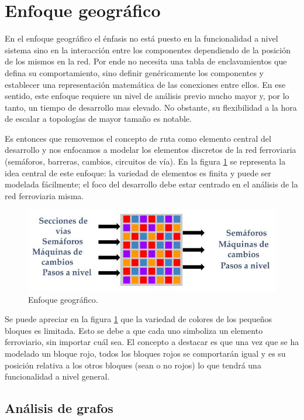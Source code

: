 \section{Enfoque geográfico}

	En el enfoque geográfico el énfasis no está puesto en la funcionalidad a nivel sistema sino en la interacción entre los componentes dependiendo de la posición de los mismos en la red. Por ende no necesita una tabla de enclavamientos que defina su comportamiento, sino definir genéricamente los componentes y establecer una representación matemática de las conexiones entre ellos. En ese sentido, este enfoque requiere un nivel de análisis previo mucho mayor y, por lo tanto, un tiempo de desarrollo mas elevado. No obstante, su flexibilidad a la hora de escalar a topologías de mayor tamaño es notable.
	
	Es entonces que removemos el concepto de ruta como elemento central del desarrollo y nos enfocamos a modelar los elementos discretos de la red ferroviaria (semáforos, barreras, cambios, circuitos de vía). En la figura \ref{fig:Enfoque_Geografico} se representa la idea central de este enfoque: la variedad de elementos es finita y puede ser modelada fácilmente; el foco del desarrollo debe estar centrado en el análisis de la red ferroviaria misma.
	
		\begin{figure}[h]
		\centering
			\includegraphics[scale=.55]{./Figures/Geografico}
			\caption{Enfoque geográfico.}
			\label{fig:Enfoque_Geografico}
		\end{figure}

	Se puede apreciar en la figura \ref{fig:Enfoque_Geografico} que la variedad de colores de los pequeños bloques es limitada. Esto se debe a que cada uno simboliza un elemento ferroviario, sin importar cuál sea. El concepto a destacar es que una vez que se ha modelado un bloque rojo, todos los bloques rojos se comportarán igual y es su posición relativa a los otros bloques (sean o no rojos) lo que tendrá una funcionalidad a nivel general.
	
	\subsection{Análisis de grafos}
		
